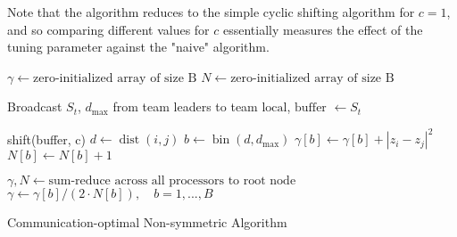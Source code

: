 Note that the algorithm reduces to the simple cyclic shifting algorithm for $c = 1$, and so comparing different values for $c$ essentially measures the effect of the tuning parameter against the "naive" algorithm.

\begin{algorithm}[H]
 \DontPrintSemicolon

 
 $\gamma \gets \text{zero-initialized array of size B}$ \;
 $N \gets \text{zero-initialized array of size B}$ \;
  
 
 Broadcast $S_t$, $d_{\max}$ from team leaders to team \;
 $\text{local}$, $\text{buffer}$ $\gets S_t$
 
  {
    shift(buffer, c) \;
	{
        $d \gets \operatorname{dist}(i, j)$ \;
        $b \gets \operatorname{bin}(d, d_{\max})$ \;
		$\gamma[b] \gets \gamma[b] + |z_i - z_j|^2$ \;
		$N[b] \gets N[b] + 1$ \;
	}
 }
 
 $\gamma, N \gets \text{sum-reduce across all processors to root node}$ \;
 $\gamma \gets \gamma[b] / (2 \cdot N[b]), \quad b = 1, ..., B$\;
 \caption{Communication-optimal Non-symmetric Algorithm}
 \label{alg:commopt}
\end{algorithm}
